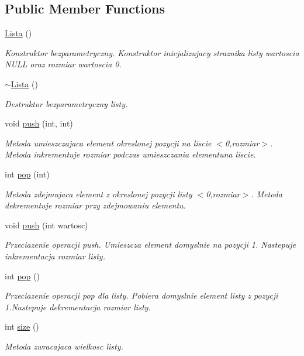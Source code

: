\subsection*{Public Member Functions}
\begin{DoxyCompactItemize}
\item 
\hyperlink{a00012_a1f668b36909182ef1360b48503529a31}{Lista} ()
\begin{DoxyCompactList}\small\item\em Konstruktor bezparametryczny. Konstruktor inicjalizujacy straznika listy wartoscia N\+U\+L\+L oraz rozmiar wartoscia 0. \end{DoxyCompactList}\item 
\hyperlink{a00012_a4d7394b2728a00ad8404965b2e15d096}{$\sim$\+Lista} ()
\begin{DoxyCompactList}\small\item\em Destruktor bezparametryczny listy. \end{DoxyCompactList}\item 
void \hyperlink{a00012_af13f329882aeacf6dd1ad28b014f2c41}{push} (int, int)
\begin{DoxyCompactList}\small\item\em Metoda umieszczajaca element okreslonej pozycji na liscie $<$0,rozmiar$>$. Metoda inkrementuje rozmiar podczas umieszczania elementuna liscie. \end{DoxyCompactList}\item 
int \hyperlink{a00012_acaf8411473b2118c8f54272a58aae14d}{pop} (int)
\begin{DoxyCompactList}\small\item\em Metoda zdejmujaca element z okreslonej pozycji listy $<$0,rozmiar$>$. Metoda dekrementuje rozmiar przy zdejmowaniu elementu. \end{DoxyCompactList}\item 
void \hyperlink{a00012_a4e00c7aa7ab1918d4f282f610f47a164}{push} (int wartosc)
\begin{DoxyCompactList}\small\item\em Przeciazenie operacji push. Umieszcza element domyslnie na pozycji 1. Nastepuje inkrementacja rozmiar listy. \end{DoxyCompactList}\item 
int \hyperlink{a00012_ad4905f890e73715d783a197a51aee985}{pop} ()
\begin{DoxyCompactList}\small\item\em Przeciazenie operacji pop dla listy. Pobiera domyslnie element listy z pozycji 1.\+Nastepuje dekrementacja rozmiar listy. \end{DoxyCompactList}\item 
int \hyperlink{a00012_a3836382e3cf53b6ea281937d045d181c}{size} ()
\begin{DoxyCompactList}\small\item\em Metoda zwracajaca wielkosc listy. \end{DoxyCompactList}\end{DoxyCompactItemize}


